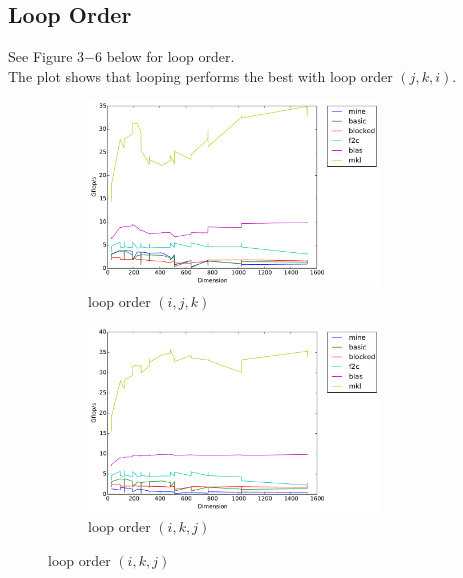 \documentclass[12pt]{article}
\numberwithin{equation}{section}
\begin{document}
\subsection{Loop Order}

See Figure 3$-$6 below for loop order.
\\
The plot shows that looping performs the best with loop order $(j, k, i)$.

\begin{figure}[!ht]
   \begin{subfigure}
      \centering
        \begin{center}
      \includegraphics[width=0.85\textwidth] {ijk}
        \end{center}
      \label{aload0}
      \caption{loop order $(i, j, k)$}
  \end{subfigure}
  \begin{subfigure}
      \centering
        \begin{center}
      \includegraphics[width=0.85\textwidth] {ikj}
        \end{center}
      \label{aload1}
      \caption{loop order $(i, k, j)$}
  \end{subfigure}

\end{figure}
\end{document}
